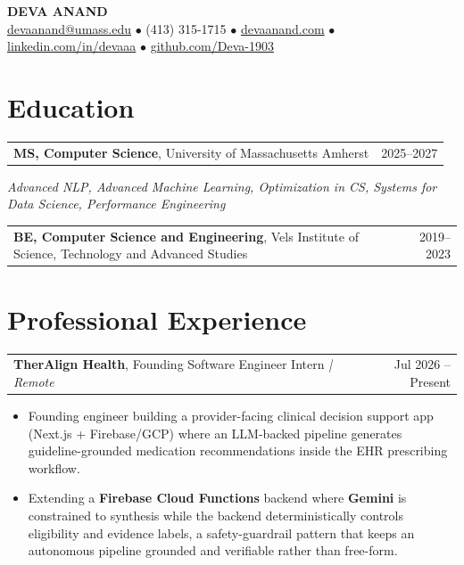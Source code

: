 \documentclass[letterpaper,11pt]{article}
\makeatletter
\newcommand{\eduItem}[3]{%
  \begin{tabular*}{\textwidth}{@{}l@{\extracolsep{\fill}}r@{}}
    \textbf{#1}, #2 & #3 \\
  \end{tabular*}\par
}
\newcommand{\expItem}[4]{%
  \vspace{2pt}
  \begin{tabular*}{\textwidth}{@{}l@{\extracolsep{\fill}}r@{}}
    \textbf{#1}, #2 \textit{| #3} & #4 \\
  \end{tabular*}\par\vspace{-3pt}
}
\makeatother
\begin{document}
\begin{center}
    {\fontsize{18}{20}\selectfont\bfseries DEVA ANAND}\\ \vspace{3pt}
    {\small
    \href{mailto:devaanand@umass.edu}{devaanand@umass.edu}
    \enspace$\bullet$\enspace
    (413) 315-1715
    \enspace$\bullet$\enspace
    \href{https://devaanand.com}{devaanand.com}
    \enspace$\bullet$\enspace
    \href{https://linkedin.com/in/devaaa/}{linkedin.com/in/devaaa}
    \enspace$\bullet$\enspace
    \href{https://github.com/Deva-1903}{github.com/Deva-1903}}
\end{center}
\vspace{-8pt}

\section{Education}
\eduItem{MS, Computer Science}{University of Massachusetts Amherst}{2025--2027}
{\small\textit{Advanced NLP, Advanced Machine Learning, Optimization in CS, Systems for Data Science, Performance Engineering}}\par
\vspace{3pt}
\eduItem{BE, Computer Science and Engineering}{Vels Institute of Science, Technology and Advanced Studies}{2019--2023}

\section{Professional Experience}

\expItem{TherAlign Health}{Founding Software Engineer Intern}{Remote}{Jul 2026 -- Present}
\begin{itemize}
  \item Founding engineer building a provider-facing clinical decision support app (Next.js + Firebase/GCP) where an LLM-backed pipeline generates guideline-grounded medication recommendations inside the EHR prescribing workflow.
  \item Extending a \textbf{Firebase Cloud Functions} backend where \textbf{Gemini} is constrained to synthesis while the backend deterministically controls eligibility and evidence labels, a safety-guardrail pattern that keeps an autonomous pipeline grounded and verifiable rather than free-form.
\end{itemize}
\end{document}
